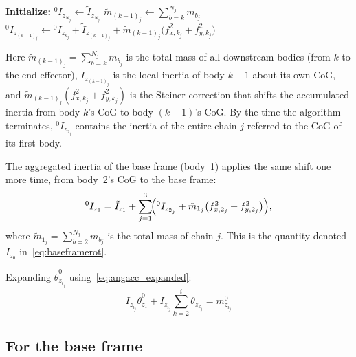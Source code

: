 \begin{algorithm}[H]
\caption{Planar inertia aggregation for the $j$th chain — planar reduction of Algorithm~1 in~\cite{Al-Rawashdeh2022_Caracterization}}
\begin{algorithmic}[1]
\State \textbf{Initialize:} $^0I_{z_{N_j}} \leftarrow \tilde{I}_{z_{N_j}}$
        \State $\tilde{m}_{(k-1)_j} \leftarrow \displaystyle\sum_{b=k}^{N_j} m_{b_j}$
        \State $^0I_{z_{(k-1)_j}} \leftarrow {}^0I_{z_{k_j}} + \tilde{I}_{z_{(k-1)_j}} + \tilde{m}_{(k-1)_j}\bigl(f_{x,k_j}^2 + f_{y,k_j}^2\bigr)$
    \EndFor
\EndIf
\end{algorithmic}
\end{algorithm}

Here $\tilde{m}_{(k-1)_j} = \sum_{b=k}^{N_j} m_{b_j}$ is the total mass of all downstream bodies (from $k$ to the end-effector), $\tilde{I}_{z_{(k-1)_j}}$ is the local inertia of body $k-1$ about its own CoG, and $\tilde{m}_{(k-1)_j}(f_{x,k_j}^2 + f_{y,k_j}^2)$ is the Steiner correction that shifts the accumulated inertia from body $k$'s CoG to body $(k-1)$'s CoG. By the time the algorithm terminates, $^0I_{z_{2_j}}$ contains the inertia of the entire chain $j$ referred to the CoG of its first body.

The aggregated inertia of the base frame (body~1) applies the same shift one more time, from body~2's CoG to the base frame:
\begin{equation} \label{eq:Iz0}
    {}^0I_{z_1} = \tilde{I}_{z_1}
    + \sum_{j=1}^{3}\!\Bigl({}^0I_{z_{2_j}}
      + \tilde{m}_{1_j}\bigl(f_{x,2_j}^2 + f_{y,2_j}^2\bigr)\Bigr),
\end{equation}
where $\tilde{m}_{1_j} = \sum_{b=2}^{N_j} m_{b_j}$ is the total mass of chain $j$. This is the quantity denoted $I_{z_0}$ in~\eqref{eq:baseframerot}.

Expanding $\ddot{\theta}^0_{z_{i_j}}$ using~\eqref{eq:angacc_expanded}:
\begin{equation} \label{eq:torqueeq_expanded}
    I_{z_{i_j}}\ddot{\theta}^{0}_{z_1} 
    + I_{z_{i_j}}\sum^{i}_{k=2}\ddot{\theta}_{z_{k_j}}
    = m^0_{z_{i_j}}
\end{equation}

\subsection{For the base frame}

